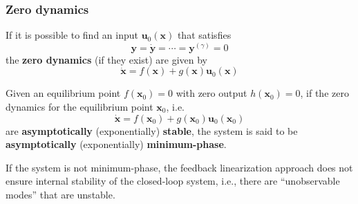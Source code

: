 \subsubsection{Zero dynamics}

If it is possible to find an input $\mathbf{u}_0(\mathbf{x})$ that satisfies
\noindent\begin{equation*}
    \mathbf{y}=\dot{\mathbf{y}}=\cdots=\mathbf{y}^{(\gamma)}=0
\end{equation*}
the \textbf{zero dynamics} (if they exist) are given by
\begin{equation*}
    \dot{\mathbf{x}} = f(\mathbf{x}) + g(\mathbf{x})\mathbf{u}_0(\mathbf{x})
\end{equation*}

Given an equilibrium point $f(\mathbf{x}_0)=0$ with zero output $h(\mathbf{x}_0)=0$, if the zero dynamics for the equilibrium point $\mathbf{x}_0$, i.e.\
\begin{equation*}
    \dot{\mathbf{x}} = f(\mathbf{x}_0) + g(\mathbf{x}_0)\mathbf{u}_0(\mathbf{x}_0)
\end{equation*}
are \textbf{asymptotically} (exponentially) \textbf{stable}, the system is said to be \textbf{asymptotically} (exponentially) \textbf{minimum-phase}.


\newpar{}

If the system is not minimum-phase, the feedback linearization approach does not ensure internal stability of the closed-loop system, i.e., there are ``unobservable modes'' that are unstable.